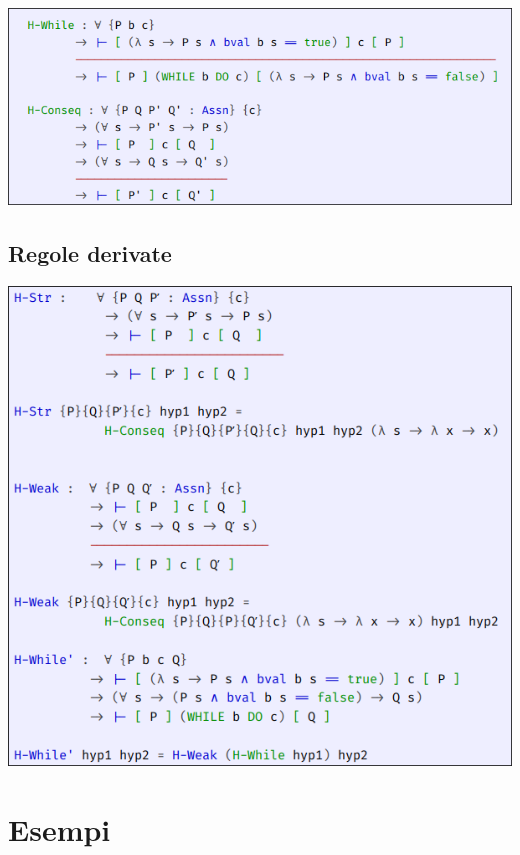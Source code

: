 \begin{center}
 \includegraphics[scale = 0.4]{images/IMP/T2}
\end{center}


\subsection{Regole derivate}


\begin{center}
 \includegraphics[scale = 0.4]{images/IMP/T3}
\end{center}

\section{Esempi}

